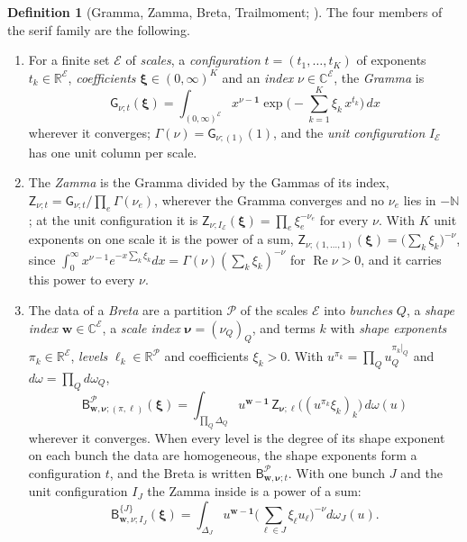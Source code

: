 \documentclass[11pt]{article}
\theoremstyle{plain}
\theoremstyle{definition}
\newtheorem{defn}[prop]{Definition}
\theoremstyle{remark}
\newcommand{\R}{\mathbb R}
\newcommand{\N}{\mathbb N}
\newcommand{\sG}{\mathsf G}
\newcommand{\sZ}{\mathsf Z}
\newcommand{\sB}{\mathsf B}
\DeclareMathOperator{\re}{Re}
\begin{document}
\begin{defn}[Gramma, Zamma, Breta, Trailmoment; {\cite[Defs.~2.1, 2.12, 3.1, 5.1, 5.2, pp.~13--28]{F}}]\label{def:serif}
The four members of the serif family are the following.
\begin{enumerate}[label=(\roman*)]
\item For a finite set $\mathcal E$ of \emph{scales}, a \emph{configuration} $t=(t_1,\dots,t_K)$ of exponents $t_k\in\R^{\mathcal E}$, \emph{coefficients} $\boldsymbol\xi\in(0,\infty)^K$ and an \emph{index} $\nu\in\mathbb C^{\mathcal E}$, the \emph{Gramma} is
\[
\sG_{\nu;t}(\boldsymbol\xi)=\int_{(0,\infty)^{\mathcal E}}x^{\nu-\mathbf 1}\exp\Big(-\sum_{k=1}^K\xi_k\,x^{t_k}\Big)\,dx
\]
wherever it converges; $\Gamma(\nu)=\sG_{\nu;(1)}(1)$, and the \emph{unit configuration} $I_{\mathcal E}$ has one unit column per scale.
\item The \emph{Zamma} is the Gramma divided by the Gammas of its index, $\sZ_{\nu;t}=\sG_{\nu;t}/\prod_e\Gamma(\nu_e)$, wherever the Gramma converges and no $\nu_e$ lies in $-\N$; at the unit configuration it is $\sZ_{\nu;I_{\mathcal E}}(\boldsymbol\xi)=\prod_e\xi_e^{-\nu_e}$ for every $\nu$. With $K$ unit exponents on one scale it is the power of a sum, $\sZ_{\nu;(1,\dots,1)}(\boldsymbol\xi)=\big(\sum_k\xi_k\big)^{-\nu}$, since $\int_0^\infty x^{\nu-1}e^{-x\sum_k\xi_k}dx=\Gamma(\nu)(\sum_k\xi_k)^{-\nu}$ for $\re\nu>0$, and it carries this power to every $\nu$.
\item The data of a \emph{Breta} are a partition $\mathcal P$ of the scales $\mathcal E$ into \emph{bunches} $Q$, a \emph{shape index} $\mathbf w\in\mathbb C^{\mathcal E}$, a \emph{scale index} $\boldsymbol\nu=(\nu_Q)_Q$, and terms $k$ with \emph{shape exponents} $\pi_k\in\R^{\mathcal E}$, \emph{levels} $\ell_k\in\R^{\mathcal P}$ and coefficients $\xi_k>0$. With $u^{\pi_k}=\prod_Qu_Q^{\pi_k|_Q}$ and $d\omega=\prod_Qd\omega_Q$,
\[
\sB^{\mathcal P}_{\mathbf w,\boldsymbol\nu;(\pi,\ell)}(\boldsymbol\xi)=\int_{\prod_Q\Delta_Q}u^{\mathbf w-\mathbf 1}\,\sZ_{\boldsymbol\nu;\ell}\big((u^{\pi_k}\xi_k)_k\big)\,d\omega(u)
\]
wherever it converges. When every level is the degree of its shape exponent on each bunch the data are homogeneous, the shape exponents form a configuration $t$, and the Breta is written $\sB^{\mathcal P}_{\mathbf w,\boldsymbol\nu;t}$. With one bunch $J$ and the unit configuration $I_J$ the Zamma inside is a power of a sum:
\[
\sB^{\{J\}}_{\mathbf w,\nu;I_J}(\boldsymbol\xi)=\int_{\Delta_J}u^{\mathbf w-\mathbf 1}\Big(\sum_{\ell\in J}\xi_\ell u_\ell\Big)^{-\nu}d\omega_J(u).
\]
\end{enumerate}
\end{defn}
\end{document}

